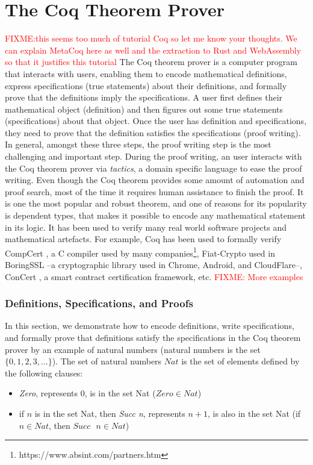 \documentclass[conference,compsoc]{IEEEtran}
\begin{document}
\section{The Coq Theorem Prover}\label{coq_theorem}
\textcolor{red}{FIXME:this seems too much of tutorial Coq so let me know your thoughts. We 
can explain MetaCoq here as well and the extraction to Rust and WebAssembly
so that it justifies this tutorial}
The Coq theorem prover \cite{the_coq_development_team} is a computer program that interacts with users, 
enabling them to encode mathematical definitions, express specifications (true statements) about 
their definitions, and formally prove that the definitions imply the specifications. 
A user first defines their mathematical object (definition) and then figures 
out some true statements (specifications) about 
that object. Once the user has definition and specifications, they need to prove 
that the definition satisfies the specifications 
(proof writing). In general, amongst these three steps, 
the proof writing step is the most challenging and important step. 
During the proof writing, an user interacts with the Coq theorem prover 
via \emph{tactics}, a domain specific language 
to ease the proof writing. Even though the Coq theorem 
provides some amount of automation and proof 
search, most of the time it requires human assistance to finish the proof. 
It is one the most popular and robust theorem, and
one of reasons for its popularity is 
dependent types, that makes it possible to encode
any mathematical statement in its logic.
It has been used to verify many real world software projects and mathematical 
artefacts. For example, Coq has been used to 
formally verify CompCert \cite{10.1145/1111037.1111042}, 
a C compiler used by many companies\footnote{https://www.absint.com/partners.htm}, 
Fiat-Crypto \cite{8835346} 
used in BoringSSL --a cryptographic library used in Chrome, Android, 
and CloudFlare--, ConCert \cite{10.1145/3372885.3373829}, 
a smart contract certification framework, etc. \textcolor{red}{FIXME: More examples}



\subsubsection*{Definitions, Specifications, and Proofs}
In this section, we demonstrate how to encode definitions, write specifications,
and formally prove that definitions satisfy the specifications 
in the Coq theorem prover by an example of 
natural numbers (natural numbers is the set $\{0, 1, 2, 3, \dots \}$). 
The set of natural numbers $Nat$ is the set of elements defined by the 
following clauses:
\begin{itemize}
  \item \emph{Zero}, represents $0$, is in the set Nat ($Zero \in Nat$)
  \item if $n$ is in the set Nat, then \emph{Succ n}, represents $n + 1$, 
    is also in the set Nat (if $n \in Nat$, then $Succ \text{ }n \in Nat$)
\end{itemize}
\end{document}
